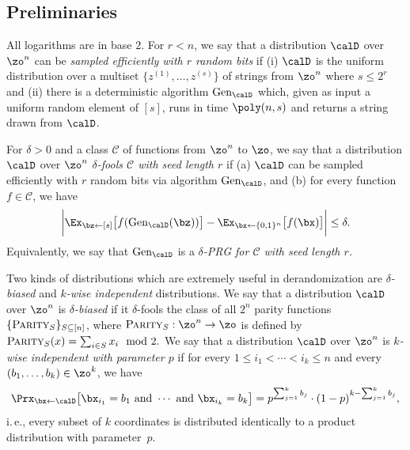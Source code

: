 \documentclass[11pt]{article}
\numberwithin{equation}{section}
\theoremstyle{definition}
\theoremstyle{plain}
\newcommand{\ie}{i.\,e.}
\theoremstyle{plain}
\begin{document}
\subsection{Preliminaries} \label{sec:prelim}

All logarithms are in base $2$. %
For $r < n$, we say that a distribution $\calD$ over $\zo^n$ can be \emph{sampled efficiently with $r$ random bits} if (i) $\calD$ is the uniform distribution over a multiset $\{z^{(1)},\dots,z^{(s)}\}$ of strings from $\zo^n$  where $s \leq 2^r$
%
and (ii) there is a deterministic algorithm $\mathrm{Gen}_{\calD}$ which, given as input a uniform random element of $[s]$, runs in time $\poly(n,s)$ and returns a string drawn from $\calD$.

%
%

For $\delta>0$ and a class $\mathscr{C}$ of functions from $\zo^n$ to $\zo$, we say that a distribution $\calD$ over $\zo^n$ \emph{$\delta$-fools $\mathscr{C}$ with seed length $r$} if (a) $\calD$ can be sampled efficiently with $r$ random bits via algorithm $\mathrm{Gen}_\calD$, and (b) for every function $f \in \mathscr{C}$, we have
\[
\bigg|\Ex_{\bz \leftarrow [s]}\big[f(\mathrm{Gen}_{\calD}(\bz))\big] - 
\Ex_{\bx \leftarrow \{0,1\}^n}\big[f(\bx)\big]\bigg| \leq \delta.
\]
Equivalently, we say that $\mathrm{Gen}_\calD$ is a \emph{$\delta$-PRG for $\mathscr{C}$ with seed length $r$.}

Two kinds of distributions which are extremely useful in derandomization are \emph{$\delta$-biased} and \emph{$k$-wise independent} distributions.
We say that a distribution $\calD$ over $\zo^n$ is \emph{$\delta$-biased} if it $\delta$-fools the class 
of all $2^n$ parity functions $\{\text{{\sc Parity}}_S\}_{S \subseteq [n]}$, where $\text{{\sc Parity}}_S: \zo^n \to \zo$ is defined
by $\text{{\sc Parity}}_S(x) = \sum_{i \in S} x_i \mod 2.$
We say that a distribution $\calD$ over $\zo^n$ is \emph{$k$-wise independent with parameter $p$} if for every $1 \leq i_1 < \cdots < i_k \leq n$ and every $(b_1,\dots,b_k) \in \zo^k$, we have
\[
\Prx_{\bx \leftarrow \calD}\big[\bx_{i_1} = b_1 \text{~and~} \cdots \text{~and~}\bx_{i_k} = b_k\big] = p^{\sum_{j=1}^k b_j}  \cdot
(1-p)^{k - \sum_{j=1}^k b_j},
\]
\ie, every subset of $k$ coordinates is distributed identically to a product distribution with parameter~$p$.
\end{document}
